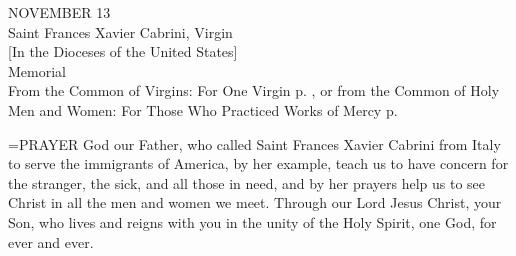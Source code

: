\begin{center}\normalsize NOVEMBER 13\\
\footnotesize Saint Frances Xavier Cabrini, Virgin\\
\footnotesize [In the Dioceses of the United States]\\
\footnotesize Memorial\\
\footnotesize From the Common of Virgins: For One Virgin p.   , or from the Common of Holy\\
\footnotesize Men and Women: For Those Who Practiced Works of Mercy p.\\
\end{center}

\hangindent=\parindent \small{PRAYER 
God our Father,
who called Saint Frances Xavier Cabrini from Italy
to serve the immigrants of America,
by her example,
teach us to have concern for the stranger,
the sick, and all those in need,
and by her prayers help us to see Christ
in all the men and women we meet.
Through our Lord Jesus Christ, your Son,
who lives and reigns with you in the unity of the Holy Spirit,
one God, for ever and ever.\\}
 
